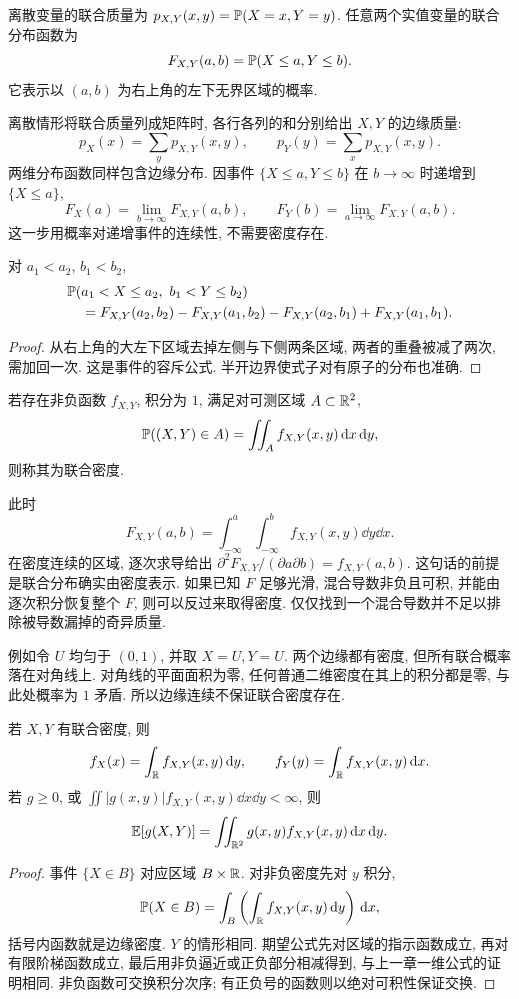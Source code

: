 
\begin{definition}[联合分布]
离散变量的联合质量为 $p_{X,Y}(x,y)=\mathbb P(X=x,Y=y)$. 任意两个实值变量的联合分布函数为
\[
 F_{X,Y}(a,b)=\mathbb P(X\le a,Y\le b).
\]
它表示以 $(a,b)$ 为右上角的左下无界区域的概率.
\end{definition}

离散情形将联合质量列成矩阵时, 各行各列的和分别给出 $X,Y$ 的边缘质量:
\[
 p_X(x)=\sum_y p_{X,Y}(x,y),\qquad
 p_Y(y)=\sum_x p_{X,Y}(x,y).
\]
两维分布函数同样包含边缘分布. 因事件 $\{X\le a,Y\le b\}$ 在 $b\to\infty$ 时递增到 $\{X\le a\}$,
\[
 F_X(a)=\lim_{b\to\infty}F_{X,Y}(a,b),\qquad
 F_Y(b)=\lim_{a\to\infty}F_{X,Y}(a,b).
\]
这一步用概率对递增事件的连续性, 不需要密度存在.

\begin{proposition}[矩形概率]
对 $a_1<a_2$, $b_1<b_2$,
\begin{align*}
 &\mathbb P(a_1<X\le a_2,\ b_1<Y\le b_2)\\
 &\quad=F_{X,Y}(a_2,b_2)-F_{X,Y}(a_1,b_2)
       -F_{X,Y}(a_2,b_1)+F_{X,Y}(a_1,b_1).
\end{align*}
\end{proposition}
\begin{proof}
从右上角的大左下区域去掉左侧与下侧两条区域, 两者的重叠被减了两次, 需加回一次. 这是事件的容斥公式. 半开边界使式子对有原子的分布也准确.
\end{proof}

\begin{definition}[联合密度]
若存在非负函数 $f_{X,Y}$, 积分为 $1$, 满足对可测区域 $A\subset\mathbb R^2$,
\[
 \mathbb P((X,Y)\in A)=\iint_A f_{X,Y}(x,y)\,\mathrm d x\,\mathrm d y,
\]
则称其为联合密度.
\end{definition}

此时
\[
 F_{X,Y}(a,b)=\int_{-\infty}^a\int_{-\infty}^b
                 f_{X,Y}(x,y)\dd y\dd x.
\]
在密度连续的区域, 逐次求导给出
$\partial^2F_{X,Y}/(\partial a\partial b)=f_{X,Y}(a,b)$.
这句话的前提是联合分布确实由密度表示. 如果已知 $F$ 足够光滑, 混合导数非负且可积, 并能由逐次积分恢复整个 $F$, 则可以反过来取得密度. 仅仅找到一个混合导数并不足以排除被导数漏掉的奇异质量.

例如令 $U$ 均匀于 $(0,1)$, 并取 $X=U,Y=U$. 两个边缘都有密度, 但所有联合概率落在对角线上. 对角线的平面面积为零, 任何普通二维密度在其上的积分都是零, 与此处概率为 $1$ 矛盾. 所以边缘连续不保证联合密度存在.

\begin{proposition}[边缘密度与联合期望]
若 $X,Y$ 有联合密度, 则
\[
 f_X(x)=\int_{\mathbb R}f_{X,Y}(x,y)\,\mathrm d y,\qquad
 f_Y(y)=\int_{\mathbb R}f_{X,Y}(x,y)\,\mathrm d x.
\]
若 $g\ge0$, 或 $\iint |g(x,y)|f_{X,Y}(x,y)\dd x\dd y<\infty$, 则
\[
 \mathbb E[g(X,Y)]=\iint_{\mathbb R^2}g(x,y)f_{X,Y}(x,y)\,\mathrm d x\,\mathrm d y.
\]
\end{proposition}
\begin{proof}
事件 $\{X\in B\}$ 对应区域 $B\times\mathbb R$. 对非负密度先对 $y$ 积分,
\[
 \mathbb P(X\in B)=\int_B\left(\int_{\mathbb R}f_{X,Y}(x,y)\,\mathrm d y\right)\,\mathrm d x,
\]
括号内函数就是边缘密度. $Y$ 的情形相同. 期望公式先对区域的指示函数成立, 再对有限阶梯函数成立, 最后用非负逼近或正负部分相减得到, 与上一章一维公式的证明相同. 非负函数可交换积分次序; 有正负号的函数则以绝对可积性保证交换.
\end{proof}

